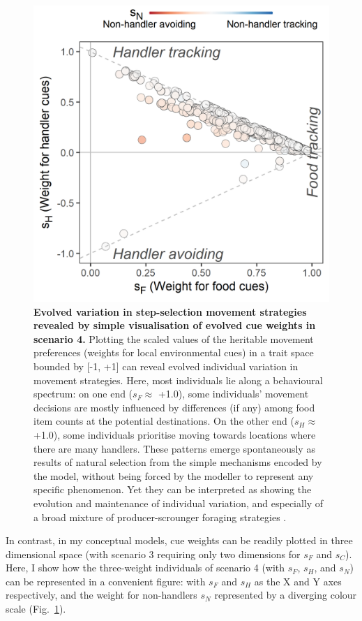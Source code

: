 \begin{interludeenv}
\begin{figure}[h]
    \centering
    \includegraphics[width=0.8\linewidth]{figures/introduction/fig_hypervolume.png}
    \caption{
        \textbf{Evolved variation in step-selection movement strategies revealed by simple visualisation of evolved cue weights in scenario 4.}
        Plotting the scaled values of the heritable movement preferences (weights for local environmental cues) in a trait space bounded by [-1, +1] can reveal evolved individual variation in movement strategies. Here, most individuals lie along a behavioural spectrum: on one end ($s_F \approx$ +1.0), some individuals' movement decisions are mostly influenced by differences (if any) among food item counts at the potential destinations. On the other end ($s_H \approx$ +1.0), some individuals prioritise moving towards locations where there are many handlers.
        These patterns emerge spontaneously as results of natural selection from the simple mechanisms encoded by the model, without being forced by the modeller to represent any specific phenomenon. Yet they can be interpreted as showing the evolution and maintenance of individual variation, and especially of a broad mixture of producer-scrounger foraging strategies \parencite{beauchamp2008}.
    }
    \label{fig:demo_hypervolume}
  \end{figure}

In contrast, in my conceptual models, cue weights can be readily plotted in three dimensional space (with scenario 3 requiring only two dimensions for $s_F$ and $s_C$).
Here, I show how the three-weight individuals of scenario 4 (with $s_F$, $s_H$, and $s_N$) can be represented in a convenient figure: with $s_F$ and $s_H$ as the X and Y axes respectively, and the weight for non-handlers $s_N$ represented by a diverging colour scale (Fig.~\ref{fig:demo_hypervolume}).


\end{interludeenv}
